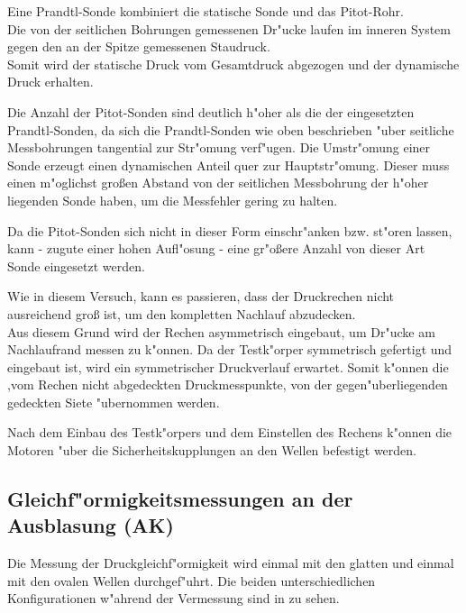Eine Prandtl-Sonde kombiniert die statische Sonde und das Pitot-Rohr.\\
Die von der seitlichen Bohrungen gemessenen Dr"ucke laufen im inneren System gegen den an der Spitze gemessenen Staudruck.\\
Somit wird der statische Druck vom Gesamtdruck abgezogen und der dynamische Druck erhalten.

Die Anzahl der Pitot-Sonden sind deutlich h"oher als die der eingesetzten Prandtl-Sonden, da sich die Prandtl-Sonden wie oben beschrieben "uber seitliche Messbohrungen tangential zur Str"omung verf"ugen. Die Umstr"omung einer Sonde erzeugt einen dynamischen Anteil quer zur Hauptstr"omung. Dieser muss einen m"oglichst gro\ss{}en Abstand von der seitlichen Messbohrung der h"oher liegenden Sonde haben, um die Messfehler gering zu halten.

Da die Pitot-Sonden sich nicht in dieser Form einschr"anken bzw. st"oren lassen, kann - zugute einer hohen Aufl"osung - eine gr"o\ss{}ere Anzahl von dieser Art Sonde eingesetzt werden.

Wie in diesem Versuch, kann es passieren, dass der Druckrechen nicht ausreichend gro\ss{} ist, um den kompletten Nachlauf abzudecken.\\
Aus diesem Grund wird der Rechen asymmetrisch eingebaut, um Dr"ucke am Nachlaufrand messen zu k"onnen. Da der Testk"orper symmetrisch gefertigt und eingebaut ist, wird ein symmetrischer Druckverlauf erwartet. Somit k"onnen die ,vom Rechen nicht abgedeckten Druckmesspunkte, von der gegen"uberliegenden gedeckten Siete "ubernommen werden.

Nach dem Einbau des Testk"orpers und dem Einstellen des Rechens k"onnen die Motoren "uber die Sicherheitskupplungen an den Wellen befestigt werden.


\subsection{Gleichf"ormigkeitsmessungen an der Ausblasung (AK)}
\label{s:Gleichf"ormigkeitsmessungen}
Die Messung der Druckgleichf"ormigkeit wird einmal mit den glatten und einmal mit den ovalen Wellen durchgef"uhrt. Die beiden unterschiedlichen Konfigurationen w"ahrend der Vermessung sind in  zu sehen.

